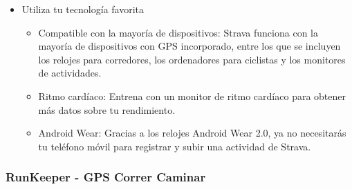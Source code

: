 \documentclass[a4paper, 11pt]{article}
\begin{document}
\begin{itemize}
\begin{itemize}
\begin{itemize}
                        \end{itemize}
                        \item {Utiliza tu tecnología favorita}
                        \begin{itemize}
                          \item {Compatible con la mayoría de dispositivos: Strava funciona con la mayoría de dispositivos con GPS incorporado, entre los que se incluyen los relojes para corredores, los ordenadores para ciclistas y los monitores de actividades.}
                          \item {Ritmo cardíaco: Entrena con un monitor de ritmo cardíaco para obtener más datos sobre tu rendimiento.}
                          \item {Android Wear: Gracias a los relojes Android Wear 2.0, ya no necesitarás tu teléfono móvil para registrar y subir una actividad de Strava.}
                        \end{itemize}
                      \end{itemize}
                \end{itemize}

          \subsubsection{RunKeeper - GPS Correr Caminar}
\end{document}
